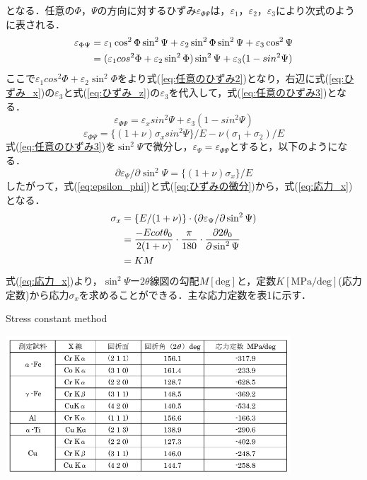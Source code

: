 となる．任意の$\Phi$，$\Psi$の方向に対するひずみ$\varepsilon_{\Phi\Psi}$は，$\varepsilon_1$，$\varepsilon_2$，$\varepsilon_3$により次式のように表される．
\begin{align}
    \varepsilon_{\Phi\Psi} &= \varepsilon_1\cos^2\Phi \sin^2\Psi + \varepsilon_2\sin^2\Phi\sin^2\Psi + \varepsilon_3\cos^2\Psi \notag \\
    &= (\varepsilon_1cos^2\Phi + \varepsilon_2\sin^2\Phi)\sin^2\Psi + \varepsilon_3(1 - sin^2\Psi) \label{eq:任意のひずみ}
\end{align}
ここで$\varepsilon_1cos^2\Phi + \varepsilon_2\sin^2\Phi$をより式(\ref{eq:任意のひずみ2})となり，右辺に式(\ref{eq:ひずみ_x})の$\varepsilon_3$と式(\ref{eq:ひずみ_z})の$\varepsilon_3$を代入して，式(\ref{eq:任意のひずみ3})となる．
\begin{equation}
    \varepsilon_{\Phi\Psi} = \varepsilon_xsin^2\Psi + \varepsilon_3(1 - sin^2\Psi)
    \label{eq:任意のひずみ2}
\end{equation}
\begin{equation}
    \varepsilon_{\Phi\Psi} = \{(1 + \nu)\sigma_xsin^2\Psi\}/E - \nu(\sigma_1 + \sigma_2)/E 
    \label{eq:任意のひずみ3}
\end{equation}
式(\ref{eq:任意のひずみ3})を$\sin^2\Psi$で微分し，$\varepsilon_\Psi = \varepsilon_{\Phi\Psi}$とすると，以下のようになる．
\begin{equation}
    \partial \varepsilon_\Psi/\partial \sin^2\Psi = \{(1 + \nu)\sigma_x\}/E
    \label{eq:ひずみの微分}
\end{equation}
したがって，式(\ref{eq:epsilon_phi})と式(\ref{eq:ひずみの微分})から，式(\ref{eq:応力_x})となる．
\begin{align}
    \sigma_x &= \{E/(1 + \nu)\} \cdot (\partial \varepsilon_\Psi/\partial \sin^2\Psi) \notag \\
    &= \frac{-Ecot\theta_0}{2(1 + \nu)} \cdot \frac{\pi}{180} \cdot \frac{\partial 2\theta_0}{\partial \sin^2\Psi} \notag \\
    &= KM
    \label{eq:応力_x}
\end{align}
式(\ref{eq:応力_x})より，$\sin^2\Psi$ー$2\theta$線図の勾配$M[\mathrm{deg}]$と，定数$K[\mathrm{MPa/deg}]$(応力定数)から応力$\sigma_x$を求めることができる．主な応力定数を表1に示す．
\clearpage
\begin{table}[htbp]
    \centering
    \caption{Stress constant method} %
    \label{tbl:応力定数表} %
    \includegraphics[width=0.8\textwidth]{fig/応力定数表.png} %
\end{table}
